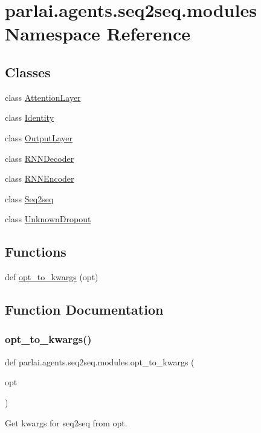 \hypertarget{namespaceparlai_1_1agents_1_1seq2seq_1_1modules}{}\section{parlai.\+agents.\+seq2seq.\+modules Namespace Reference}
\label{namespaceparlai_1_1agents_1_1seq2seq_1_1modules}
\subsection*{Classes}
\begin{DoxyCompactItemize}
\item 
class \hyperlink{classparlai_1_1agents_1_1seq2seq_1_1modules_1_1AttentionLayer}{Attention\+Layer}
\item 
class \hyperlink{classparlai_1_1agents_1_1seq2seq_1_1modules_1_1Identity}{Identity}
\item 
class \hyperlink{classparlai_1_1agents_1_1seq2seq_1_1modules_1_1OutputLayer}{Output\+Layer}
\item 
class \hyperlink{classparlai_1_1agents_1_1seq2seq_1_1modules_1_1RNNDecoder}{R\+N\+N\+Decoder}
\item 
class \hyperlink{classparlai_1_1agents_1_1seq2seq_1_1modules_1_1RNNEncoder}{R\+N\+N\+Encoder}
\item 
class \hyperlink{classparlai_1_1agents_1_1seq2seq_1_1modules_1_1Seq2seq}{Seq2seq}
\item 
class \hyperlink{classparlai_1_1agents_1_1seq2seq_1_1modules_1_1UnknownDropout}{Unknown\+Dropout}
\end{DoxyCompactItemize}
\subsection*{Functions}
\begin{DoxyCompactItemize}
\item 
def \hyperlink{namespaceparlai_1_1agents_1_1seq2seq_1_1modules_a1ae0eb3090a7701670b5144e47ad2850}{opt\+\_\+to\+\_\+kwargs} (opt)
\end{DoxyCompactItemize}


\subsection{Function Documentation}
\mbox{\label{namespaceparlai_1_1agents_1_1seq2seq_1_1modules_a1ae0eb3090a7701670b5144e47ad2850}} 
\subsubsection{\texorpdfstring{opt\+\_\+to\+\_\+kwargs()}{opt\_to\_kwargs()}}
{\footnotesize\ttfamily def parlai.\+agents.\+seq2seq.\+modules.\+opt\+\_\+to\+\_\+kwargs (\begin{DoxyParamCaption}\item[{}]{opt }\end{DoxyParamCaption})}

\begin{DoxyVerb}Get kwargs for seq2seq from opt.
\end{DoxyVerb}
 